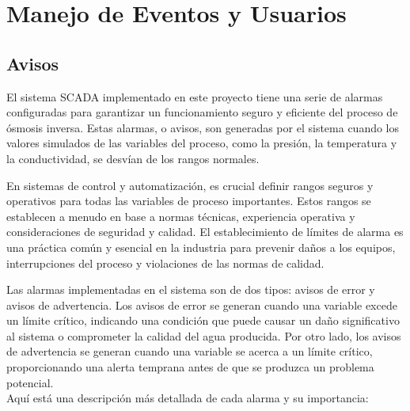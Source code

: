 \chapter{Manejo de Eventos y Usuarios}


\section{Avisos}
El sistema SCADA implementado en este proyecto tiene una serie de alarmas configuradas para garantizar un funcionamiento seguro y eficiente del proceso de ósmosis inversa. Estas alarmas, o avisos, son generadas por el sistema cuando los valores simulados de las variables del proceso, como la presión, la temperatura y la conductividad, se desvían de los rangos normales.\\



En sistemas de control y automatización, es crucial definir rangos seguros y operativos para todas las variables de proceso importantes. Estos rangos se establecen a menudo en base a normas técnicas, experiencia operativa y consideraciones de seguridad y calidad. El establecimiento de límites de alarma es una práctica común y esencial en la industria para prevenir daños a los equipos, interrupciones del proceso y violaciones de las normas de calidad.

Las alarmas implementadas en el sistema son de dos tipos: avisos de error y avisos de advertencia. Los avisos de error se generan cuando una variable excede un límite crítico, indicando una condición que puede causar un daño significativo al sistema o comprometer la calidad del agua producida. Por otro lado, los avisos de advertencia se generan cuando una variable se acerca a un límite crítico, proporcionando una alerta temprana antes de que se produzca un problema potencial.\\

Aquí está una descripción más detallada de cada alarma y su importancia:\\

